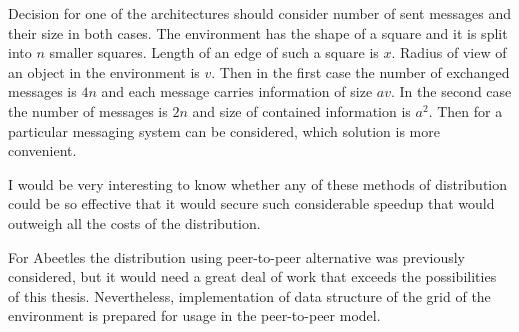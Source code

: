 Decision for one of the architectures should consider number of sent messages and their size in both cases. The environment has the shape of a square and it is split into $n$ smaller squares. Length of an edge of such a square is $x$. Radius of view of an object in the environment is $v$. Then in the first case the number of exchanged messages is $4n$ and each message carries information of size $av$. In the second case the number of messages is $2n$ and size of contained information is $a^2$. Then for a particular messaging system can be considered, which solution is more convenient.  


I would be very interesting to know whether any of these methods of distribution could be so effective that it would secure such considerable speedup that would outweigh all the costs of the distribution.

For Abeetles the distribution using peer-to-peer alternative was previously considered, but it would need a great deal of work that exceeds the possibilities of this thesis. Nevertheless, implementation of data structure of the grid of the environment is prepared for usage in the peer-to-peer model. 
